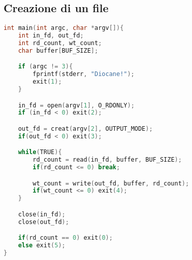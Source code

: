 \subsection{Creazione di un file}
\begin{lstlisting}[language=c]
int main(int argc, char *argv[]){
    int in_fd, out_fd;
    int rd_count, wt_count;
    char buffer[BUF_SIZE];

    if (argc != 3){
        fprintf(stderr, "Diocane!");
        exit(1);
    }

    in_fd = open(argv[1], O_RDONLY);
    if (in_fd < 0) exit(2);

    out_fd = creat(argv[2], OUTPUT_MODE);
    if(out_fd < 0) exit(3);

    while(TRUE){
        rd_count = read(in_fd, buffer, BUF_SIZE);
        if(rd_count <= 0) break;

        wt_count = write(out_fd, buffer, rd_count);
        if(wt_count <= 0) exit(4);
    }

    close(in_fd);
    close(out_fd);

    if(rd_count == 0) exit(0);
    else exit(5);
}
\end{lstlisting}

